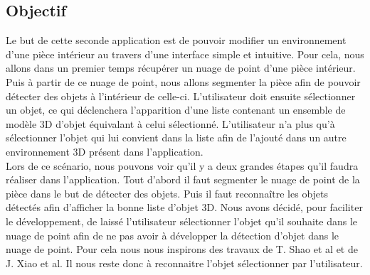 
\subsection{Objectif}
Le but de cette seconde application est de pouvoir modifier un environnement d'une pièce intérieur au travers d'une interface
simple et intuitive. 
Pour cela, nous allons dans un premier temps récupérer un nuage de point d'une pièce intérieur. Puis à partir
de ce nuage de point, nous allons segmenter la pièce afin de pouvoir détecter des objets à l'intérieur de celle-ci.
L'utilisateur doit ensuite sélectionner un objet, ce qui déclenchera l'apparition d'une liste contenant un ensemble de modèle 3D
d'objet équivalant à celui sélectionné. L'utilisateur n'a plus qu'à sélectionner l'objet qui lui convient dans la liste
afin de l'ajouté dans un autre environnement 3D présent dans l'application.\\

Lors de ce scénario, nous pouvons voir qu'il y a deux grandes étapes qu'il faudra réaliser dans l'application. Tout d'abord il faut 
segmenter le nuage de point de la pièce dans le but de détecter des objets. Puis il faut reconnaître les objets détectés afin
d'afficher la bonne liste d'objet 3D. Nous avons décidé, pour faciliter le développement, de laissé l'utilisateur sélectionner
l'objet qu'il souhaite dans le nuage de point afin de ne pas avoir à développer la détection d'objet dans le nuage de point.
Pour cela nous nous inspirons des travaux de T. Shao et al\cite{interactiveSeg} et de J. Xiao et al\cite{interactionSeg2}.
Il nous reste donc à reconnaitre l'objet sélectionner par l'utilisateur.

